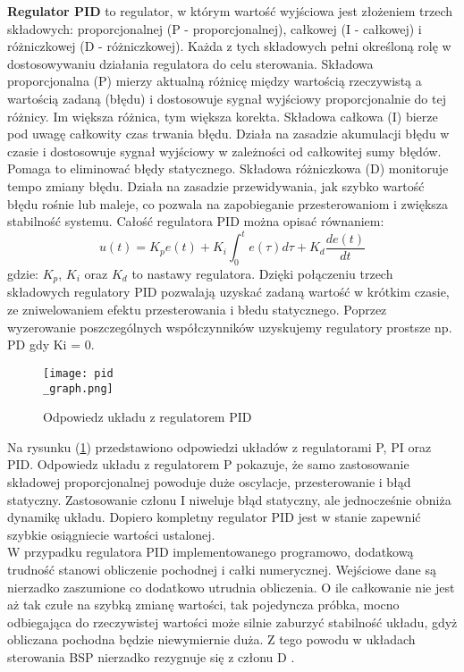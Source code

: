 \textbf{Regulator PID}  to regulator, w którym wartość wyjściowa jest złożeniem trzech składowych: proporcjonalnej (P - proporcjonalnej), całkowej (I - całkowej) i różniczkowej (D - różniczkowej). Każda z tych składowych pełni określoną rolę w dostosowywaniu działania regulatora do celu sterowania.
Składowa proporcjonalna (P) mierzy aktualną różnicę między wartością rzeczywistą a wartością zadaną (błędu) i dostosowuje sygnał wyjściowy proporcjonalnie do tej różnicy. Im większa różnica, tym większa korekta.
Składowa całkowa (I) bierze pod uwagę całkowity czas trwania błędu. Działa na zasadzie akumulacji błędu w czasie i dostosowuje sygnał wyjściowy w zależności od całkowitej sumy błędów. Pomaga to eliminować błędy statycznego.
Składowa różniczkowa (D) monitoruje tempo zmiany błędu. Działa na zasadzie przewidywania, jak szybko wartość błędu rośnie lub maleje, co pozwala na zapobieganie przesterowaniom i zwiększa stabilność systemu.
Całość regulatora PID można opisać równaniem:
\[
	u(t) = K_p e(t) + K_i \int_{0}^{t} e(\tau) d\tau + K_d \frac{de(t)}{dt}
\]
gdzie: $K_p$, $K_i$ oraz $K_d$ to nastawy regulatora. Dzięki połączeniu trzech składowych regulatory PID pozwalają uzyskać zadaną wartość w krótkim czasie, ze zniwelowaniem efektu przesterowania i błedu statycznego. Poprzez wyzerowanie poszczególnych współczynników uzyskujemy regulatory prostsze np. PD gdy Ki = 0.\\

\begin{figure}[!h]
   	\centering
      	\texttt{[image: pid\\\_graph.png]}
      	\caption{Odpowiedz układu z regulatorem PID}
      	\label{pid_respose}
\end{figure}

Na rysunku (\ref{pid_respose}) przedstawiono odpowiedzi układów z regulatorami P, PI oraz PID. Odpowiedz układu z regulatorem P pokazuje, że samo zastosowanie składowej proporcjonalnej powoduje duże oscylacje, przesterowanie i błąd statyczny. Zastosowanie członu I niweluje błąd statyczny, ale jednocześnie obniża dynamikę układu. Dopiero kompletny regulator PID jest w stanie zapewnić szybkie osiągniecie wartości ustalonej.\\

W przypadku regulatora PID implementowanego programowo, dodatkową trudność stanowi obliczenie pochodnej i całki numerycznej. Wejściowe dane są nierzadko zaszumione co dodatkowo utrudnia obliczenia. O ile całkowanie nie jest aż tak czułe na szybką zmianę wartości, tak pojedyncza próbka, mocno odbiegająca do rzeczywistej wartości może silnie zaburzyć stabilność układu, gdyż obliczana pochodna będzie niewymiernie duża. Z tego powodu w układach sterowania BSP nierzadko rezygnuje się z członu D \cite{piff} .\\

